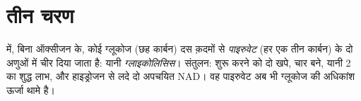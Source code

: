 \section{तीन चरण}

\begin{proposition}[ग्लाइकोलिसिस]\label{prop:g12:respiration-fermentation:glycolysis}
 में, बिना ऑक्सीजन के, कोई ग्लूकोज (छह कार्बन) दस 
क़दमों से \emph{पाइरुवेट} (हर एक तीन कार्बन) के दो अणुओं में चीर दिया जाता
है: यानी \emph{ग्लाइकोलिसिस}। संतुलन: शुरू करने को दो
 खपे, चार बने, यानी 2  का शुद्ध लाभ, और हाइड्रोजन से लदे दो अपचयित
NAD। वह पाइरुवेट अब भी ग्लूकोज की अधिकांश ऊर्जा थामे है।
\end{proposition}
\admitted

